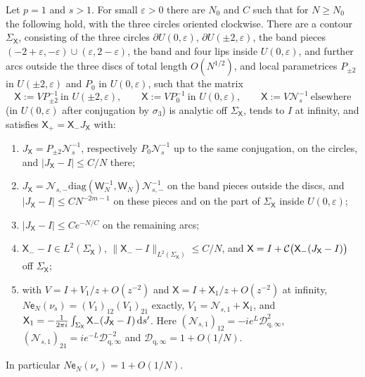 \begin{proposition}\label{prop:pone-first}
Let $p=1$ and $s>1$. For small $\varepsilon>0$ there are $N_0$ and $C$ such that for $N\ge N_0$ the following hold,
with the three circles oriented clockwise.
There are a contour $\Sigma_{\mathsf X}$, consisting of the three circles $\partial U(0,\varepsilon)$, $\partial U(\pm2,\varepsilon)$,
the band pieces $(-2+\varepsilon,-\varepsilon)\cup(\varepsilon,2-\varepsilon)$, the band and four lips inside $U(0,\varepsilon)$,
and further arcs outside the three discs of total length $O(N^{1/2})$, and local parametrices $P_{\pm2}$ in
$U(\pm2,\varepsilon)$ and $P_0$ in $U(0,\varepsilon)$, such that the matrix
\[
  \mathsf X:=V P_{\pm2}^{-1}\ \text{in }U(\pm2,\varepsilon),\qquad \mathsf X:=VP_0^{-1}\ \text{in }U(0,\varepsilon),\qquad
  \mathsf X:=V\mathcal N_s^{-1}\ \text{elsewhere}
\]
\textup{(}in $U(0,\varepsilon)$ after conjugation by $\sigma_3$\textup{)} is analytic off $\Sigma_{\mathsf X}$, tends to $I$ at
infinity, and satisfies $\mathsf X_+=\mathsf X_-J_{\mathsf X}$ with:
\begin{enumerate}
\item[(i)] $J_{\mathsf X}=P_{\pm2}\mathcal N_s^{-1}$, respectively $P_0\mathcal N_s^{-1}$ up to the same conjugation, on the
  circles, and $|J_{\mathsf X}-I|\le C/N$ there;
\item[(ii)] $J_{\mathsf X}=\mathcal N_{s,-}\mathrm{diag}(\mathsf W_N^{-1},\mathsf W_N)\mathcal N_{s,-}^{-1}$ on the band pieces
  outside the discs, and $|J_{\mathsf X}-I|\le CN^{-2m-1}$ on these pieces and on the part of $\Sigma_{\mathsf X}$ inside
  $U(0,\varepsilon)$;
\item[(iii)] $|J_{\mathsf X}-I|\le Ce^{-N/C}$ on the remaining arcs;
\item[(iv)] $\mathsf X_--I\in L^2(\Sigma_{\mathsf X})$, $\|\mathsf X_--I\|_{L^2(\Sigma_{\mathsf X})}\le C/N$, and
  $\mathsf X=I+\mathcal{C}\bigl(\mathsf X_-(J_{\mathsf X}-I)\bigr)$ off $\Sigma_{\mathsf X}$;
\item[(v)] with $V=I+V_1/z+O(z^{-2})$ and $\mathsf X=I+\mathsf X_1/z+O(z^{-2})$ at infinity,
  $N\mathsf e_N(\nu_s)=(V_1)_{12}(V_1)_{21}$ exactly, $V_1=\mathcal N_{s,1}+\mathsf X_1$, and
  $\mathsf X_1=-\frac1{2\pi i}\int_{\Sigma_{\mathsf X}}\mathsf X_-(J_{\mathsf X}-I)\,\mathrm{d} s'$. Here
  $(\mathcal N_{s,1})_{12}=-ie^L\mathcal D_{\mathrm q,\infty}^2$, $(\mathcal N_{s,1})_{21}=ie^{-L}\mathcal D_{\mathrm q,\infty}^{-2}$ and
  $\mathcal D_{\mathrm q,\infty}=1+O(1/N)$.
\end{enumerate}
In particular $N\mathsf e_N(\nu_s)=1+O(1/N)$.
\end{proposition}

